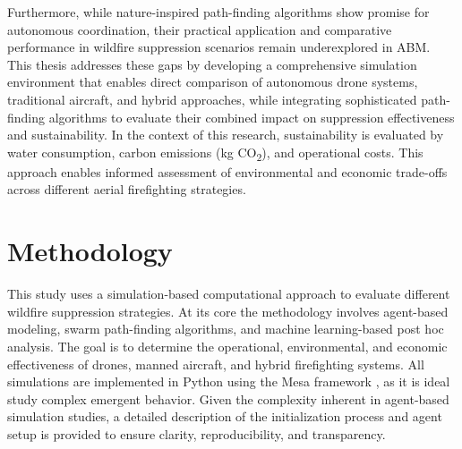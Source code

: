 \documentclass[twoside]{article}
\begin{document}
Furthermore, while nature-inspired path-finding algorithms show promise for autonomous coordination, their practical application and comparative performance in wildfire suppression scenarios remain underexplored in ABM. This thesis addresses these gaps by developing a comprehensive simulation environment that enables direct comparison of autonomous drone systems, traditional aircraft, and hybrid approaches, while integrating sophisticated path-finding algorithms to evaluate their combined impact on suppression effectiveness and sustainability.
In the context of this research, sustainability is evaluated by water consumption, carbon emissions (kg CO\textsubscript{2}), and operational costs. This approach enables informed assessment of environmental and economic trade-offs across different aerial firefighting strategies.

\section{Methodology}
\label{sec:Methodology}

This study uses a simulation-based computational approach to evaluate different wildfire suppression strategies. At its core the methodology involves agent-based modeling, swarm path-finding algorithms, and machine learning-based post hoc analysis. The goal is to determine the operational, environmental, and economic effectiveness of drones, manned aircraft, and hybrid firefighting systems. All simulations are implemented in Python using the Mesa framework \citep{terMesa}, as it is ideal study complex emergent behavior. Given the complexity inherent in agent-based simulation studies, a detailed description of the initialization process and agent setup is provided to ensure clarity, reproducibility, and transparency.
\end{document}
